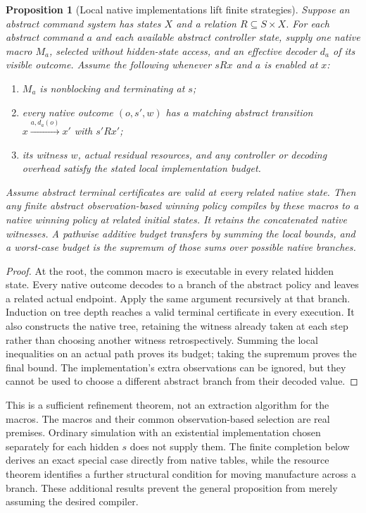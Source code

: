 \documentclass[11pt]{article}
\newtheorem{proposition}[theorem]{Proposition}
\theoremstyle{definition}
\theoremstyle{remark}
\begin{document}
\begin{proposition}[Local native implementations lift finite strategies]
\label{prop:macro-lift}
Suppose an abstract command system has states $X$ and a relation
$R\subseteq S\times X$. For each abstract command $a$ and each available
abstract controller state, supply one native macro $M_a$, selected
without hidden-state access, and an effective decoder $d_a$ of its visible
outcome. Assume the following whenever $sRx$ and $a$ is enabled at $x$:
\begin{enumerate}
\item $M_a$ is nonblocking and terminating at $s$;
\item every native outcome $(o,s',w)$ has a matching abstract transition
      $x\xrightarrow{a,d_a(o)}x'$ with $s'Rx'$;
\item its witness $w$, actual residual resources, and any controller or
      decoding overhead satisfy the stated local implementation budget.
\end{enumerate}
Assume abstract terminal certificates are valid at every related native
state. Then any finite abstract observation-based winning policy compiles
by these macros to a native winning policy at related initial states.
It retains the concatenated native witnesses. A pathwise additive budget
transfers by summing the local bounds, and a worst-case budget is the
supremum of those sums over possible native branches.
\end{proposition}
\begin{proof}
At the root, the common macro is executable in every related hidden
state. Every native outcome decodes to a branch of the abstract policy
and leaves a related actual endpoint. Apply the same argument recursively
at that branch. Induction on tree depth reaches a valid terminal
certificate in every execution. It also constructs the native tree,
retaining the witness already taken at each step rather than choosing
another witness retrospectively. Summing the local inequalities on an
actual path proves its budget; taking the supremum proves the final
bound. The implementation's extra observations can be ignored, but they
cannot be used to choose a different abstract branch from their decoded
value.
\end{proof}
This is a sufficient refinement theorem, not an extraction algorithm for
the macros. The macros and their common observation-based selection are
real premises. Ordinary simulation with an existential implementation
chosen separately for each hidden $s$ does not supply them. The finite
completion below derives an exact special case directly from native
tables, while the resource theorem identifies a further structural
condition for moving manufacture across a branch. These additional
results prevent the general proposition from merely assuming the desired
compiler.
\end{document}
